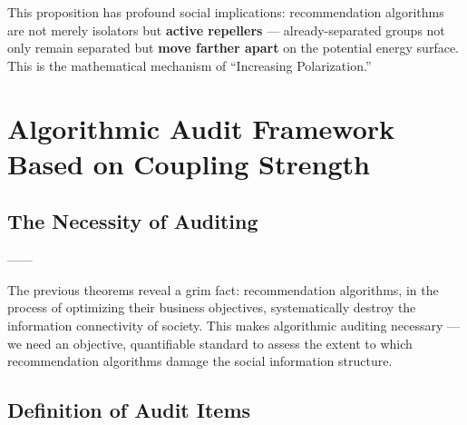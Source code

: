 \documentclass[11pt,a4paper]{article}
\theoremstyle{remark}
\begin{document}
This proposition has profound social implications: recommendation algorithms are not
merely isolators but \textbf{active repellers} --- already-separated groups not only
remain separated but \textbf{move farther apart} on the potential energy surface.
This is the mathematical mechanism of ``Increasing Polarization.''

\section{}
\section{Algorithmic Audit Framework Based on Coupling Strength}

\subsection{}

\subsection{The Necessity of Auditing}



——


The previous theorems reveal a grim fact: recommendation algorithms, in the process of
optimizing their business objectives, systematically destroy the information connectivity
of society. This makes algorithmic auditing necessary --- we need an objective,
quantifiable standard to assess the extent to which recommendation algorithms damage
the social information structure.

\subsection{}

\subsection{Definition of Audit Items}
\end{document}
